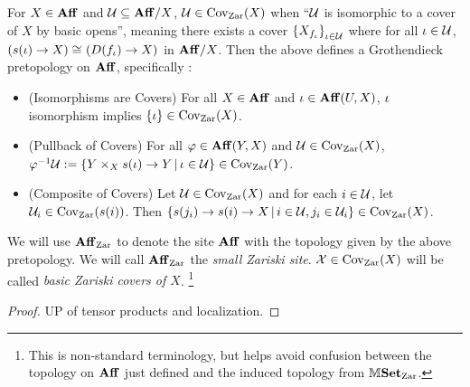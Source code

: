 \documentclass[../main.tex]{subfiles}
\begin{document}
\begin{prop}
  
  For $X \in \mathbf{Aff}$ and 
  $\mathcal{U} \subseteq \mathbf{Aff}/X$,
  $\mathcal{U} \in \operatorname{Cov}_{\mathrm{Zar}}(X)$ when 
  ``$\mathcal{U}$ is isomorphic to a cover of $X$ by basic opens'',
  meaning there exists a cover $\left\{X_{f_\iota}\right\}_{\iota \in \mathcal{U}}$
  where for all $\iota \in \mathcal{U}$,
  $\left(s(\iota) \to X\right) \cong_{} \left(D(f_\iota) \to X\right)$ in $\mathbf{Aff}/X$.
  Then the above defines a Grothendieck pretopology on $\mathbf{Aff}$,
  specifically : 
  \begin{itemize}
    \item (Isomorphisms are Covers) 
    For all $X \in \mathbf{Aff}$ and $\iota \in \mathbf{Aff}(U,X)$,
    $\iota$ isomorphism implies $\left\{\iota\right\} \in \operatorname{Cov}_{\mathrm{Zar}}(X)$.
    \item (Pullback of Covers)
    For all $\varphi \in \mathbf{Aff}(Y,X)$ and $\mathcal{U} \in \operatorname{Cov}_{\mathrm{Zar}}(X)$,\newline
    $\varphi^{-1}\mathcal{U} := \left\{Y\times_X s(\iota) \to Y \,|\, \iota \in \mathcal{U}\right\} 
    \in \operatorname{Cov}_{\mathrm{Zar}}(Y)$.
    \item (Composite of Covers)
    Let $\mathcal{U} \in \operatorname{Cov}_{\mathrm{Zar}}(X)$ and for each $i \in \mathcal{U}$,
    let $\mathcal{U}_i \in \operatorname{Cov}_{\mathrm{Zar}}(s(i))$.
    Then $\left\{s(j_i) \to s(i) \to X \,|\, i \in \mathcal{U}, j_i \in \mathcal{U}_i\right\}
    \in \operatorname{Cov}_{\mathrm{Zar}}(X)$.
  \end{itemize}
  We will use $\mathbf{Aff}_{\mathrm{Zar}}$ to denote the site $\mathbf{Aff}$ with 
  the topology given by the above pretopology.
  We will call $\mathbf{Aff}_{\mathrm{Zar}}$ the \emph{small Zariski site}.
  $\mathcal{X} \in \operatorname{Cov}_{\mathrm{Zar}}(X)$ will be called \emph{basic Zariski covers of $X$}.
  \footnote{
    This is non-standard terminology, but helps avoid 
    confusion between the topology on $\mathbf{Aff}$ just defined and 
    the induced topology from $\mathbb{M}\mathbf{Set}_{\mathrm{Zar}}$.
  }
\end{prop}
\begin{proof}
  UP of tensor products and localization.
\end{proof}
\end{document}
